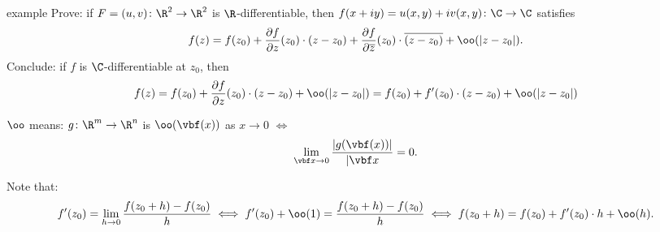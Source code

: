 \documentclass[class=article, crop=false]{standalone}
\begin{document}
\begin{understandingcheck}{example}
  Prove: if $F = (u,v) \colon \R^2 \to \R^2$ is $\R$-differentiable, then $f(x+iy) = u(x,y) + iv(x,y) \colon \C \to \C$ satisfies
    \[
      f(z) = f(z_0) + \frac{\partial f}{\partial z}(z_0) \cdot (z-z_0) + \frac{\partial f}{\partial \overline z}(z_0) \cdot \overline{(z-z_0)} + \oo(|z-z_0|).
    \]
  Conclude: if $f$ is $\C$-differentiable at $z_0$, then
    \[
      f(z) = f(z_0)+ \frac{\partial f}{\partial z}(z_0) \cdot (z-z_0) + \oo(|z-z_0|) = f(z_0)+ f'(z_0) \cdot (z-z_0) + \oo(|z-z_0|)
    \]
\end{understandingcheck}

\begin{rem}
  $\oo$ means: $g\colon \R^m \to \R^n$ is $\oo(\vbf(x))$ as $x \to 0$ $\iff$
    \[
      \lim_{\vbf x\to 0} \frac{|g(\vbf(x))|}{|\vbf x}=0.
    \]

  Note that:
    \[
      f'(z_0) = \lim_{h \to 0} \frac{f(z_0+h)-f(z_0)}{h} \iff f'(z_0) +\oo(1) = \frac{f(z_0+h)-f(z_0)}{h} \iff f(z_0+h)=f(z_0)+f'(z_0) \cdot h + \oo(h).
    \]

\end{rem}
\end{document}
